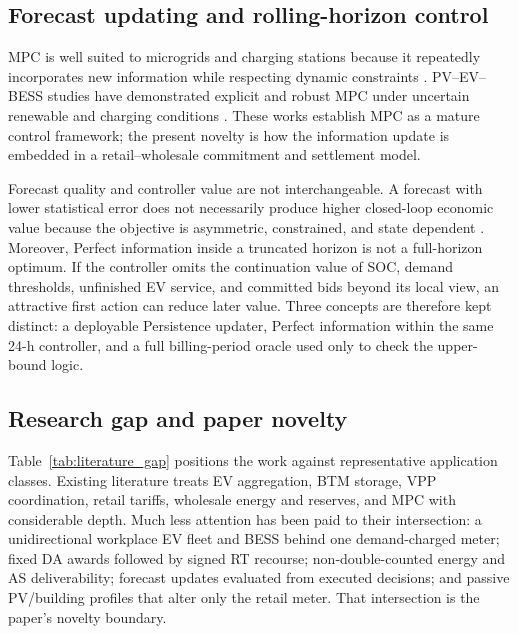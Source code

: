 \documentclass[final,5p,times]{elsarticle}
\begin{document}
\subsection{Forecast updating and rolling-horizon control}
MPC is well suited to microgrids and charging stations because it repeatedly incorporates new information while respecting dynamic constraints \cite{parisio2014model} \cite{rawlings2017mpc} \cite{hermans2024implementation} \cite{klemets2024charging}. PV--EV--BESS studies have demonstrated explicit and robust MPC under uncertain renewable and charging conditions \cite{cabrera2022realtime} \cite{cabrera2024robust}. These works establish MPC as a mature control framework; the present novelty is how the information update is embedded in a retail--wholesale commitment and settlement model.

Forecast quality and controller value are not interchangeable. A forecast with lower statistical error does not necessarily produce higher closed-loop economic value because the objective is asymmetric, constrained, and state dependent \cite{ludolfinger2025prediction}. Moreover, Perfect information inside a truncated horizon is not a full-horizon optimum. If the controller omits the continuation value of SOC, demand thresholds, unfinished EV service, and committed bids beyond its local view, an attractive first action can reduce later value. Three concepts are therefore kept distinct: a deployable Persistence updater, Perfect information within the same 24-h controller, and a full billing-period oracle used only to check the upper-bound logic.

\subsection{Research gap and paper novelty}
Table~\ref{tab:literature_gap} positions the work against representative application classes. Existing literature treats EV aggregation, BTM storage, VPP coordination, retail tariffs, wholesale energy and reserves, and MPC with considerable depth. Much less attention has been paid to their intersection: a unidirectional workplace EV fleet and BESS behind one demand-charged meter; fixed DA awards followed by signed RT recourse; non-double-counted energy and AS deliverability; forecast updates evaluated from executed decisions; and passive PV/building profiles that alter only the retail meter. That intersection is the paper's novelty boundary.
\end{document}
